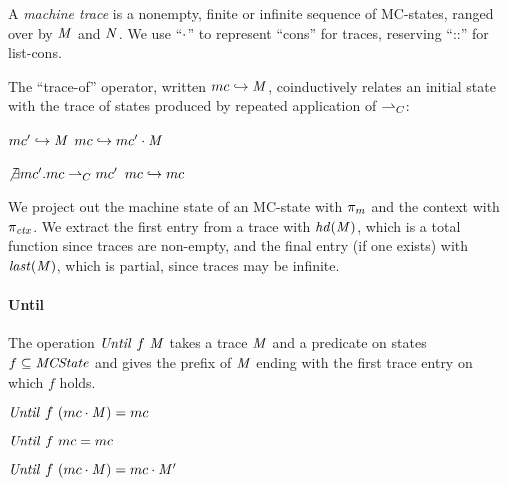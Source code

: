 \documentclass[10pt,conference]{ieeetran}%
\theoremstyle{definition}
\begin{document}
A {\em machine trace} is a nonempty, finite or infinite sequence
of MC-states, ranged over by \(\mathit{M}\) and \(\mathit{N}\).
We use ``\(\cdot\)'' to represent ``cons'' for traces, reserving ``::'' for list-cons.

The ``trace-of'' operator, written \(mc \hookrightarrow \mathit{M}\),
coinductively relates an initial state with the trace of states
produced by repeated application of \(\overset{}{\rightharpoonup}_C\):
%
\vspace{-\bigskipamount}
\begin{center}
\begin{minipage}[t]{.6\columnwidth}
            {\(mc' \hookrightarrow \mathit{M}\)}
            {\(mc \hookrightarrow mc' \cdot \mathit{M}\)}%
\end{minipage}
\begin{minipage}[t]{.35\columnwidth}
\judgment%
         {\(\not\exists mc'. mc \overset{}{\rightharpoonup}_C mc'\)}
         {\(mc \hookrightarrow mc\)}
\end{minipage}
\end{center}
\vspace{-\smallskipamount}

We project out the machine state of an MC-state with \(\pi_m\)
and the context with \(\pi_{\mathit{ctx}}\).
We extract the first entry from a trace with \(\mathit{hd}(\mathit{M})\), which is a total
function since traces are non-empty, and the final entry (if one exists) with
\(\mathit{last}(\mathit{M})\), which is partial, since traces may be infinite.

\paragraph*{Until}
The operation \(\mathit{Until} ~ f ~ \mathit{M}\) takes a trace \(\mathit{M}\)
and a predicate on states \(f \subseteq \mathit{MCState}\) and gives the prefix of
\(\mathit{M}\) ending with the first trace entry on which \(f\) holds.

\vspace{-\medskipamount}
\begin{center}
  \begin{minipage}[b]{.5\columnwidth}
             {\(\mathit{Until} ~ f ~ (mc \cdot \mathit{M}) = mc\)}
  \end{minipage}
%
  \begin{minipage}[b]{.3\columnwidth}
    \judgment{}
             {\(\mathit{Until} ~ f ~ mc = mc\)}
%
  \end{minipage}
\end{center}
                {\(\mathit{Until} ~ f ~ (mc \cdot \mathit{M}) = mc \cdot \mathit{M}'\)}
\end{document}
